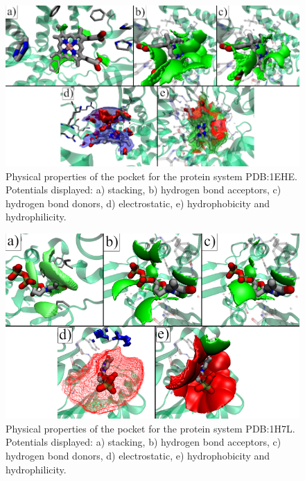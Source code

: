 \begin{figure}[H]
  \centering
  \includegraphics[width=1\textwidth]{figures/appendix/benchmark_prot/1ehe.png}
  \caption{\label{fig:appx_benchmark/1ehe} Physical properties of the pocket for the protein system PDB:1EHE. Potentials displayed: a) stacking, b) hydrogen bond acceptors, c) hydrogen bond donors, d) electrostatic, e) hydrophobicity and hydrophilicity.}
\end{figure}

\begin{figure}[H]
  \centering
  \includegraphics[width=1\textwidth]{figures/appendix/benchmark_prot/1h7l.png}
  \caption{\label{fig:appx_benchmark/1h7l} Physical properties of the pocket for the protein system PDB:1H7L. Potentials displayed: a) stacking, b) hydrogen bond acceptors, c) hydrogen bond donors, d) electrostatic, e) hydrophobicity and hydrophilicity.}
\end{figure}

